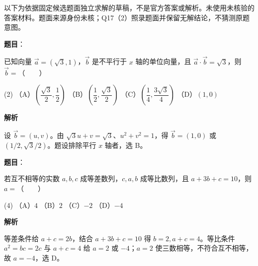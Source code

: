 

\begin{gktip}
以下为依据固定候选题面独立求解的草稿，不是官方答案或解析。未使用未核验的答案材料。题面来源身份未核；Q17（2）照录题面并保留无解结论，不猜测原题意图。
\end{gktip}

\begin{answer}

\textbf{题目}：

已知向量 $\vec a=(\sqrt3,1)$，$\vec b$ 是不平行于 $x$ 轴的单位向量，且 $\vec a\cdot\vec b=\sqrt3$，则 $\vec b=$\mbox{（　　）}

\begin{gkopts}(2)
\task （A）$\left(\dfrac{\sqrt3}{2},\dfrac12\right)$
\task （B）$\left(\dfrac12,\dfrac{\sqrt3}{2}\right)$
\task （C）$\left(\dfrac14,\dfrac{3\sqrt3}{4}\right)$
\task （D）$(1,0)$
\end{gkopts}

\textbf{解析}

设 $\vec b=(u,v)$。由 $\sqrt3u+v=\sqrt3$、$u^2+v^2=1$，得 $\vec b=(1,0)$ 或 $(1/2,\sqrt3/2)$。题设排除平行 $x$ 轴者，选 B。


\end{answer}
\begin{answer}

\textbf{题目}：

若互不相等的实数 $a,b,c$ 成等差数列，$c,a,b$ 成等比数列，且 $a+3b+c=10$，则 $a=$\mbox{（　　）}

\begin{gkopts}(4)
\task （A）$4$
\task （B）$2$
\task （C）$-2$
\task （D）$-4$
\end{gkopts}

\textbf{解析}

等差条件给 $a+c=2b$，结合 $a+3b+c=10$ 得 $b=2,a+c=4$。等比条件 $a^2=bc=2c$ 与 $a+c=4$ 给 $a=2$ 或 $-4$；$a=2$ 使三数相等，不符合互不相等，故 $a=-4$，选 D。


\end{answer}
